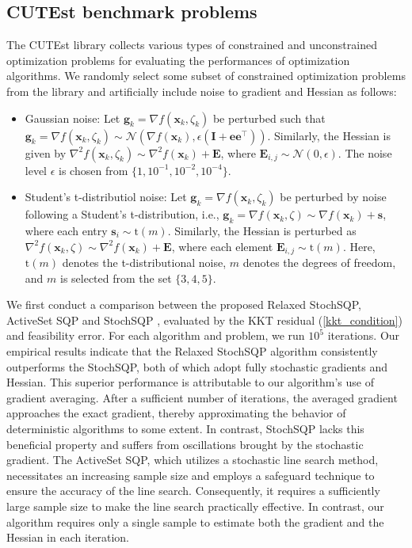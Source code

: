 \documentclass[aos]{imsart}
\numberwithin{equation}{section}
\theoremstyle{plain}
\begin{document}
\subsection{CUTEst benchmark problems}
The CUTEst library collects various types of constrained and unconstrained optimization problems for evaluating the performances of optimization algorithms. We randomly select some subset of constrained optimization problems from the library and artificially include noise to gradient and Hessian as follows:
\begin{itemize}
    \item Gaussian noise: Let $\bm{g}_k = \nabla f(\bm{x}_k, \zeta_k)$ be perturbed such that $\bm{g}_k = \nabla f(\bm{x}_k, \zeta_k) \sim \mathcal{N}(\nabla f(\bm{x}_k), \epsilon (\bm{I} + \bm{e} \bm{e}^{\top}))$. Similarly, the Hessian is given by $\nabla^2 f(\bm{x}_{k}, \zeta_k) \sim \nabla^2 f(\bm{x}_{k}) + \bm{E}$, where $\bm{E}_{i,j} \sim \mathcal{N}(0, \epsilon)$. The noise level $\epsilon$ is chosen from $\{1, 10^{-1}, 10^{-2}, 10^{-4} \}$. 

    \item Student's t-distributiol noise: 
    Let $\bm{g}_k = \nabla f(\bm{x}_k, \zeta_k)$ be perturbed by noise following a Student's t-distribution, i.e., $\bm{g}_k = \nabla f(\bm{x}_k, \zeta) \sim \nabla f(\bm{x}_k) +  \bm{s}$, where each entry $\bm{s}_{i} \sim \text{t}(m)$. Similarly, the Hessian is perturbed as $\nabla^2 f(\bm{x}_{k}, \zeta) \sim \nabla^2 f(\bm{x}_{k}) + \bm{E}$, where each element $\bm{E}_{i,j} \sim \text{t}(m)$. Here, $\text{t}(m)$ denotes the t-distributional noise, $m$ denotes the degrees of freedom, and $m$ is selected from the set $\{3, 4, 5\}$.
\end{itemize}
We first conduct a comparison between the proposed Relaxed StochSQP, ActiveSet SQP \cite{na2023inequality} and StochSQP \cite{curtis2023sequential}, evaluated by the KKT residual (\ref{kkt_condition}) and feasibility error. For each algorithm and problem, we run $10^5$ iterations. Our empirical results indicate that the Relaxed StochSQP algorithm consistently outperforms the StochSQP, both of which adopt fully stochastic gradients and Hessian. This superior performance is attributable to our algorithm's use of gradient averaging. After a sufficient number of iterations, the averaged gradient approaches the exact gradient, thereby approximating the behavior of deterministic algorithms to some extent. In contrast, StochSQP lacks this beneficial property and suffers from oscillations brought by the stochastic gradient. The ActiveSet SQP, which utilizes a stochastic line search method, necessitates an increasing sample size and employs a safeguard technique to ensure the accuracy of the line search. Consequently, it requires a sufficiently large sample size to make the line search practically effective. In contrast, our algorithm requires only a single sample to estimate both the gradient and the Hessian in each iteration.
\end{document}
